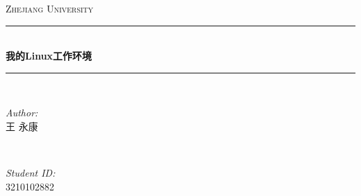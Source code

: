 \begin{titlepage}

\newcommand{\HRule}{\rule{\linewidth}{0.5mm}} %

\center %
 

\textsc{\LARGE Zhejiang University}\\[1cm] %
%

\HRule \\[0.4cm]
{ \huge \bfseries 我的Linux工作环境}\\[0.4cm] %
\HRule \\[1.5cm]
 

\begin{minipage}{0.4\textwidth}
\begin{flushleft} \large
\emph{Author:}\\
王 \textsc{永康} %
\end{flushleft}
\end{minipage}
~
\begin{minipage}{0.4\textwidth}
\begin{flushright} \large
\emph{Student ID:} \\
\textsc{3210102882} %
\end{flushright}
\end{minipage}\\[2cm]




\end{titlepage}
